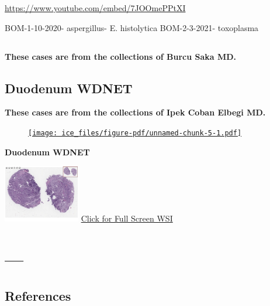 \documentclass[
  letterpaper,
  paper=6in:9in,
  pagesize=pdftex,
  headinclude=on,
  footinclude=on,
  12pt]{scrbook}
\begin{document}
\url{https://www.youtube.com/embed/7JOOmePPtXI}

BOM-1-10-2020- aspergillus- E. histolytica BOM-2-3-2021- toxoplasma

\hypertarget{section-5}{%
\chapter{}\label{section-5}}

\textbf{These cases are from the collections of Burcu Saka MD.}

\hypertarget{sec-ICE1-WDNET-duodenum}{%
\chapter{Duodenum WDNET}\label{sec-ICE1-WDNET-duodenum}}

\textbf{These cases are from the collections of Ipek Coban Elbegi MD.}

\begin{figure}[H]

{\centering 

\href{https://images.patolojiatlasi.com/ICE1-WDNET-duodenum/HE.html}{\texttt{[image: ice\_files/figure-pdf/unnamed-chunk-5-1.pdf]}}

}

\end{figure}

\textbf{Duodenum WDNET}

\href{https://images.patolojiatlasi.com/ICE1-WDNET-duodenum/HE.html}{\includegraphics[width=0.25\textwidth,height=\textheight]{./screenshots/ICE1-WDNET-duodenum_screenshot.png}}
\href{https://images.patolojiatlasi.com/ICE1-WDNET-duodenum/HE.html}{Click
for Full Screen WSI}

\part{---}


\hypertarget{references}{%
\chapter*{References}\label{references}}
\end{document}
